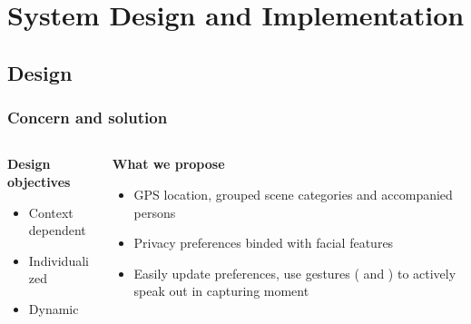 \section{System Design and Implementation}

\subsection{Design}


\begin{frame}[t]
\frametitle{Concern and solution}
\begin{columns}[T]
\begin{column}{0.5\textwidth}
  \begin{block}{\bf Design objectives}
    \begin{itemize}
        \item Context dependent
        \item Individualized
        \item Dynamic
    \end{itemize}
  \end{block}
\end{column}\hfill

\begin{column}{0.5\textwidth}
  \begin{block}{\bf What we propose}
    \begin{itemize}
        \item GPS location, grouped scene categories and accompanied persons
        \item Privacy preferences binded with facial features
        \item Easily update preferences, use gestures ( and ) to actively speak out in capturing moment
    \end{itemize}
  \end{block}

\end{column}
\end{columns}
\end{frame}

